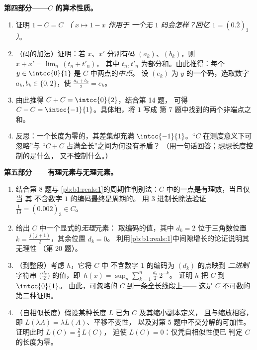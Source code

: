 \begin{problem}[{周末问题——康托尔三分集：
长度为零、不可数、完备，且 $C + C =
\intcc{0}{2}$}]
\medskip
\noindent\textbf{第四部分——$C$ 的算术性质。}
\begin{enumerate}[resume]
  \item 证明 $1 - C = C$ \emph{（ $x \mapsto 1 - x$ 作用于
        一个无 $1$ 码会怎样？回忆 $1 = (0.\overline{2})_3$）}。
  \item （码的加法）证明：若 $x$、$x'$ 分别有码
        $(a_k)$、$(b_k)$，则 $x + x' = \lim_n\,(t_n + t'_n)$，
        其中 $t_n, t'_n$ 为部分和。由此推得：每个 $y
        \in \intcc{0}{1}$ 是 $C$ 中两点的\emph{中点}。
        设 $(e_k)$ 为 $y$ 的一个码，选取数字
        $a_k, b_k \in \{0, 2\}$，使 $\frac{a_k + b_k}{2} =
        e_k$。
  \item 由此推得 $C + C = \intcc{0}{2}$，结合第 14 题，
        可得 $C - C = \intcc{-1}{1}$。具体地，将 $1$ 写成
        第 7 题中找到的两个非端点之和。
  \item 反思：一个长度为零的，其差集却充满
        $\intcc{-1}{1}$。“$C$ 在测度意义下可忽略”与
        “$C + C$ 占满全长”之间为何没有矛盾？
        （用一句话回答；想想长度控制的是什么，
        又不控制什么。）
\end{enumerate}

\medskip
\noindent\textbf{第五部分——有理元素与无理元素。}
\begin{enumerate}[resume]
  \item 结合第 8 题与
        \cref{pb:b1:reals:1}的周期性判别法：$C$ 中的一点是有理数，当且仅当
        其 不含数字 $1$ 的编码最终是周期的。
        用 $3$ 进制长除法验证 $\frac1{13} =
        (0.\overline{002})_3 \in C$。
  \item 给出 $C$ 中一个显式的\emph{无理}元素：
        取编码的值，其中 $d_k = 2$ 位于三角数位置
        $k = \frac{j(j+1)}{2}$，其余位置 $d_k = 0$。
        利用\cref{pb:b1:reals:1}中间隙增长的论证说明其无理性
        （第 20 题）。
  \item （到整段）考虑 $h$，它将
        $C$ 中 不含数字 $1$ 的编码为 $(d_k)$ 的点映到
        \emph{二进制}字符串 $\bigl(\frac{d_k}2\bigr)$ 的值，即\
        $h(x) = \sup_n \sum_{k=1}^n \frac{d_k}{2}\,2^{-k}$。
        证明 $h$ 把 $C$ \emph{}到 $\intcc{0}{1}$。
        由此，可忽略的 $C$ \omterm{def:b1:logic:inj}{满射}到一条全长线段上——
        这是 $C$ 不可数的第二种证明。
  \item （自相似长度）假设某种长度 $L$ 已为 $C$ 及其缩小副本定义，
        且与缩放相容，
        即 $L(\lambda A) = \lambda L(A)$、平移不变性，
        以及对第 5 题中不交分解的可加性。
        证明此时 $L(C) = \frac23\,L(C)$，
        迫使 $L(C) = 0$：仅凭自相似性便已
        判定 $C$ 的长度为零。
\end{enumerate}


\end{problem}
